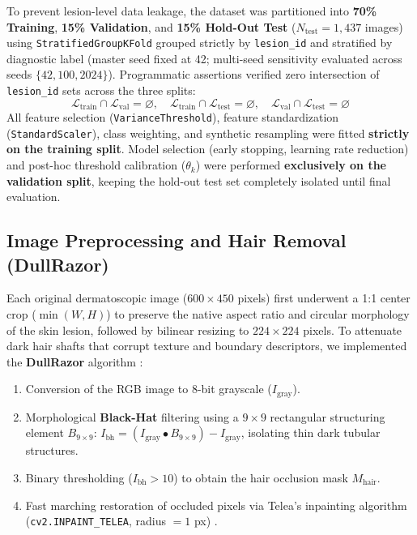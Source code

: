 \documentclass[11pt,a4paper]{article}
\begin{document}
To prevent lesion-level data leakage, the dataset was partitioned into \textbf{70\% Training}, \textbf{15\% Validation}, and \textbf{15\% Hold-Out Test} ($N_{\text{test}} = 1,437$ images) using \texttt{StratifiedGroupKFold} grouped strictly by \texttt{lesion\_id} and stratified by diagnostic label (master seed fixed at 42; multi-seed sensitivity evaluated across seeds $\{42, 100, 2024\}$). Programmatic assertions verified zero intersection of \texttt{lesion\_id} sets across the three splits:
\begin{equation}
    \mathcal{L}_{\text{train}} \cap \mathcal{L}_{\text{val}} = \varnothing, \quad
    \mathcal{L}_{\text{train}} \cap \mathcal{L}_{\text{test}} = \varnothing, \quad
    \mathcal{L}_{\text{val}} \cap \mathcal{L}_{\text{test}} = \varnothing
\end{equation}
All feature selection (\texttt{VarianceThreshold}), feature standardization (\texttt{StandardScaler}), class weighting, and synthetic resampling were fitted \textbf{strictly on the training split}. Model selection (early stopping, learning rate reduction) and post-hoc threshold calibration ($\theta_k$) were performed \textbf{exclusively on the validation split}, keeping the hold-out test set completely isolated until final evaluation.

\subsection{Image Preprocessing and Hair Removal (DullRazor)}
Each original dermatoscopic image ($600 \times 450$ pixels) first underwent a 1:1 center crop ($\min(W, H)$) to preserve the native aspect ratio and circular morphology of the skin lesion, followed by bilinear resizing to $224 \times 224$ pixels. To attenuate dark hair shafts that corrupt texture and boundary descriptors, we implemented the \textbf{DullRazor} algorithm \cite{lee1997}:
\begin{enumerate}
    \item Conversion of the RGB image to 8-bit grayscale ($I_{\text{gray}}$).
    \item Morphological \textbf{Black-Hat} filtering using a $9 \times 9$ rectangular structuring element $B_{9\times 9}$: $I_{\text{bh}} = (I_{\text{gray}} \bullet B_{9\times 9}) - I_{\text{gray}}$, isolating thin dark tubular structures.
    \item Binary thresholding ($I_{\text{bh}} > 10$) to obtain the hair occlusion mask $M_{\text{hair}}$.
    \item Fast marching restoration of occluded pixels via Telea's inpainting algorithm (\texttt{cv2.INPAINT\_TELEA}, radius $= 1$ px) \cite{telea2004}.
\end{enumerate}
\end{document}
